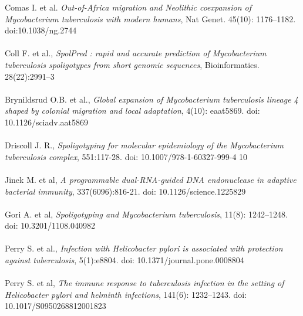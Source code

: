 \documentclass[twoside,a4paper,11pt,frenchb,openany]{report}
\begin{document}
\begin{spacing}{0.5}

\renewcommand{\bibname}{Références}
\begin{thebibliography}{10}
Comas I. et al. \textit{Out-of-Africa migration and Neolithic coexpansion of Mycobacterium tuberculosis with modern humans}, Nat Genet. 45(10): 1176–1182. doi:10.1038/ng.2744\\ \\

Coll F. et al., \textit{SpolPred : rapid and accurate prediction of Mycobacterium tuberculosis spoligotypes from short genomic sequences}, Bioinformatics. 28(22):2991–3\\ \\

Brynildsrud O.B. et al., \textit{Global expansion of Mycobacterium tuberculosis lineage 4 shaped by colonial migration and local adaptation}, 4(10): eaat5869. doi: 10.1126/sciadv.aat5869\\ \\

Driscoll J. R., \textit{Spoligotyping for molecular epidemiology of the Mycobacterium tuberculosis complex}, 551:117-28. doi: 10.1007/978-1-60327-999-4 10\\ \\

Jinek M. et al, \textit{A programmable dual-RNA-guided DNA endonuclease in adaptive bacterial immunity}, 337(6096):816-21. doi: 10.1126/science.1225829\\ \\

Gori A. et al, \textit{Spoligotyping and Mycobacterium tuberculosis}, 11(8): 1242–1248. doi: 10.3201/1108.040982\\ \\

Perry S. et al., \textit{Infection with Helicobacter pylori is associated with protection against tuberculosis}, 5(1):e8804. doi: 10.1371/journal.pone.0008804\\ \\

Perry S. et al, \textit{The immune response to tuberculosis infection in the setting of Helicobacter pylori and helminth infections}, 141(6): 1232–1243. doi: 10.1017/S0950268812001823\\ \\


\end{thebibliography}
\end{spacing}
\end{document}
